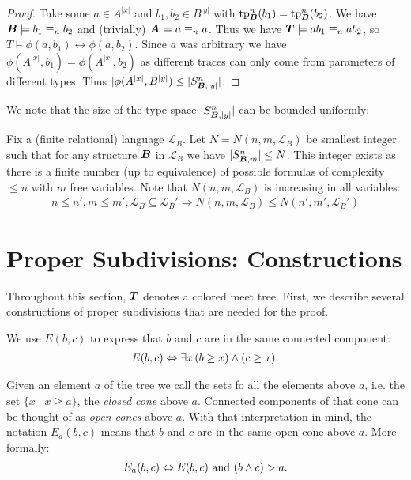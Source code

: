 \documentclass{amsart}
\DeclareMathOperator{\TT}{\boldface T}
\DeclareMathOperator{\A}{\boldface A}
\DeclareMathOperator{\B}{\boldface B}
\renewcommand{\LL}{\mathcal L}
\begin{document}
\begin{proof}
  Take some $a \in A^{|x|}$ and $b_1, b_2 \in B^{|y|}$ with $\tp^n_{\B}(b_1) = \tp^n_{\B}(b_2)$. We have $\B \models b_1 \equiv_n b_2$ and (trivially) $\A \models a \equiv_n a$. Thus  we have $\TT \models ab_1 \equiv_n ab_2$, so $T \models \phi(a, b_1) \leftrightarrow \phi(a, b_2)$. Since $a$ was arbitrary we have $\phi(A^{|x|}, b_1) = \phi(A^{|x|}, b_2)$ as different traces can only come from parameters of different types. Thus $|\phi(A^{|x|}, B^{|y|}) \leq |S^n_{\B, |y|}|$.
\end{proof}

We note that the size of the type space $|S^n_{\B, |y|}|$ can be bounded uniformly:

\begin{Definition} \label{def_type_count}
  Fix a (finite relational) language $\LL_B$. Let $N = N(n, m, \LL_B)$ be smallest integer such that for any structure $\B$ in $\LL_B$ we have $|S^n_{\B, m}| \leq N$. This integer exists as there is a finite number (up to equivalence) of possible formulas of complexity $\leq n$ with $m$ free variables.
  Note that $N(n, m, \LL_B)$ is increasing in all variables:
  \begin{align*}
    n \leq n', m \leq m', \LL_B \subseteq \LL_B' \Rightarrow N(n, m, \LL_B) \leq N(n', m', \LL_B')
  \end{align*}
\end{Definition}

\section{Proper Subdivisions: Constructions}

Throughout this section, $\TT$ denotes a colored meet tree.
First, we describe several constructions of proper subdivisions that are needed for the proof. 

\begin{Definition}
  We use $E(b,c)$ to express that $b$ and $c$ are in the same connected component:
  \begin{align*}
    E(b, c) \Leftrightarrow \exists x \, (b \geq x) \wedge (c \geq x).
  \end{align*}
\end{Definition}
\begin{Definition}
  Given an element $a$ of the tree we call the sets fo all the elements above $a$, i.e. the set $\{x \mid x \geq a\}$,
  the \emph{closed cone} above $a$.
  Connected components of that cone can be thought of as \emph{open cones} above $a$.
  With that interpretation in mind, the notation $E_a(b, c)$ means that $b$ and $c$ are in the same open cone above $a$. More formally:
  \begin{align*}
    E_a(b, c) \Leftrightarrow E(b,c) \text{ and } (b \wedge c) > a.
  \end{align*}
\end{Definition}
\end{document}

